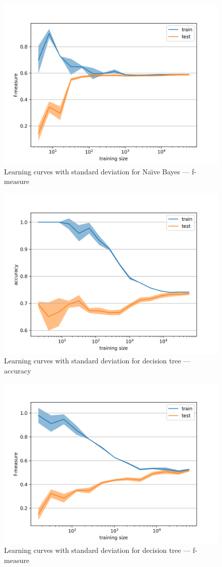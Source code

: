 \begin{figure}[h]\centering
\includegraphics[width=130mm]{figures/lc2_fm.png}
\caption{Learning curves with standard deviation for Na\"{\i}ve Bayes --- f-measure}\label{fig:l_curves2_f_measure}
\end{figure}


\begin{figure}[h]\centering
\includegraphics[width=130mm]{figures/lc3_acc.png}
\caption{Learning curves with standard deviation for decision tree --- accuracy}\label{fig:l_curves3_accuracy}
\end{figure}

\begin{figure}[h]\centering
\includegraphics[width=130mm]{figures/lc3_fm.png}
\caption{Learning curves with standard deviation for decision tree --- f-measure}\label{fig:l_curves3_f_measure}
\end{figure}
